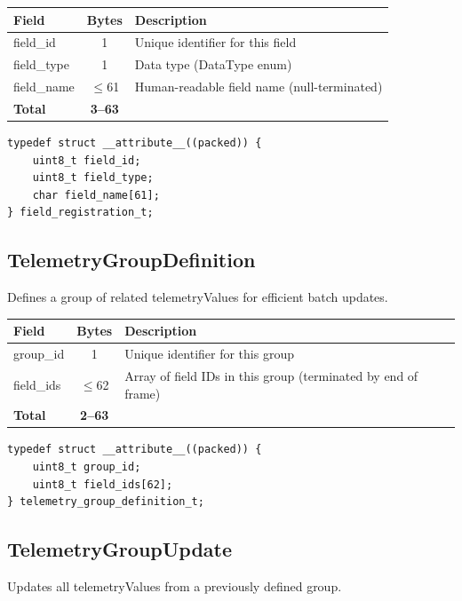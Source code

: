 \begin{center}
\begin{tabular}{l c l}
\toprule
Field & Bytes & Description \\
\midrule
field\_id & 1 & Unique identifier for this field \\
field\_type & 1 & Data type (DataType enum) \\
field\_name & $\leq$61 & Human-readable field name (null-terminated) \\
\midrule
\textbf{Total} & \textbf{3--63} & \\
\bottomrule
\end{tabular}
\end{center}


\begin{lstlisting}[caption={FieldRegistration struct}]
typedef struct __attribute__((packed)) {
    uint8_t field_id;
    uint8_t field_type; 
    char field_name[61];
} field_registration_t;
\end{lstlisting}

\subsection{TelemetryGroupDefinition}\label{struct:TelemetryGroupDefinition}
Defines a group of related telemetryValues for efficient batch updates.
\begin{center}
\begin{tabular}{l c l}
\toprule
Field & Bytes & Description \\
\midrule
group\_id & 1 & Unique identifier for this group \\
field\_ids & $\leq$62 & Array of field IDs in this group (terminated by end of frame) \\
\midrule
\textbf{Total} & \textbf{2--63} & \\
\bottomrule
\end{tabular}
\end{center}

\begin{lstlisting}[caption={TelemetryGroupDefinition struct}]
typedef struct __attribute__((packed)) {
    uint8_t group_id;
    uint8_t field_ids[62];
} telemetry_group_definition_t;
\end{lstlisting}

\subsection{TelemetryGroupUpdate}\label{struct:TelemetryGroupUpdate}
Updates all telemetryValues from a previously defined group.


